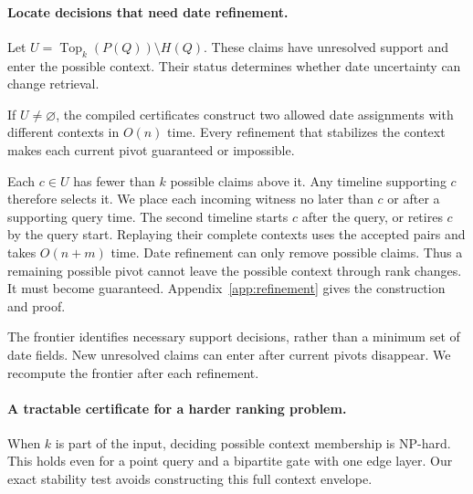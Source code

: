 \paragraph{Locate decisions that need date refinement.}
Let $U=\operatorname{Top}_k(P(Q))\setminus H(Q)$.
These claims have unresolved support and enter the possible context.
Their status determines whether date uncertainty can change retrieval.

\begin{theorem}
\label{thm:refinement}
If $U\ne\varnothing$, the compiled certificates construct two allowed date assignments with different contexts in $O(n)$ time.
Every refinement that stabilizes the context makes each current pivot guaranteed or impossible.
\end{theorem}

Each $c\in U$ has fewer than $k$ possible claims above it.
Any timeline supporting $c$ therefore selects it.
We place each incoming witness no later than $c$ or after a supporting query time.
The second timeline starts $c$ after the query, or retires $c$ by the query start.
Replaying their complete contexts uses the accepted pairs and takes $O(n+m)$ time.
Date refinement can only remove possible claims.
Thus a remaining possible pivot cannot leave the possible context through rank changes.
It must become guaranteed.
Appendix~\ref{app:refinement} gives the construction and proof.

The frontier identifies necessary support decisions, rather than a minimum set of date fields.
New unresolved claims can enter after current pivots disappear.
We recompute the frontier after each refinement.

\paragraph{A tractable certificate for a harder ranking problem.}
When $k$ is part of the input, deciding possible context membership is NP-hard.
This holds even for a point query and a bipartite gate with one edge layer.
Our exact stability test avoids constructing this full context envelope.
